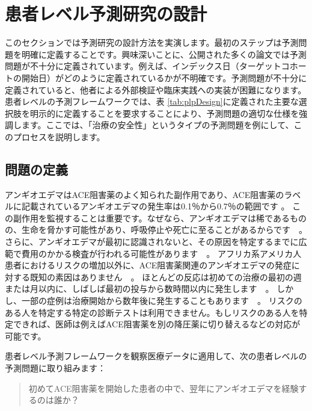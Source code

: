 \documentclass[
  11pt]{book}
\theoremstyle{definition}
\theoremstyle{definition}
\theoremstyle{definition}
\theoremstyle{definition}
\theoremstyle{remark}
\begin{document}
\section{患者レベル予測研究の設計}\label{ux60a3ux8005ux30ecux30d9ux30ebux4e88ux6e2cux7814ux7a76ux306eux8a2dux8a08}

このセクションでは予測研究の設計方法を実演します。最初のステップは予測問題を明確に定義することです。興味深いことに、公開された多くの論文では予測問題が不十分に定義されています。例えば、インデックス日（ターゲットコホートの開始日）がどのように定義されているかが不明確です。予測問題が不十分に定義されていると、他者による外部検証や臨床実践への実装が困難になります。患者レベルの予測フレームワークでは、表 \ref{tab:plpDesign}に定義された主要な選択肢を明示的に定義することを要求することにより、予測問題の適切な仕様を強調します。ここでは、「治療の安全性」というタイプの予測問題を例にして、このプロセスを説明します。 

\subsection{問題の定義}\label{ux554fux984cux306eux5b9aux7fa9-2}

アンギオエデマはACE阻害薬のよく知られた副作用であり、ACE阻害薬のラベルに記載されているアンギオエデマの発生率は0.1％から0.7％の範囲です \citep[ ]{byrd_2006}。 この副作用を監視することは重要です。なぜなら、アンギオエデマは稀であるものの、生命を脅かす可能性があり、呼吸停止や死亡に至ることがあるからです　\citep[ ]{norman_2013}。 さらに、アンギオエデマが最初に認識されないと、その原因を特定するまでに広範で費用のかかる検査が行われる可能性があります　\citep[ ]{norman_2013, thompson_1993}。 アフリカ系アメリカ人患者におけるリスクの増加以外に、ACE阻害薬関連のアンギオエデマの発症に対する既知の素因はありません　\citep[ ]{byrd_2006}。 ほとんどの反応は初めての治療の最初の週または月以内に、しばしば最初の投与から数時間以内に発生します　\citep[ ]{circardi_2004}。 しかし、一部の症例は治療開始から数年後に発生することもあります　\citep[ ]{mara_1996}。 リスクのある人を特定する特定の診断テストは利用できません。もしリスクのある人を特定できれば、医師は例えばACE阻害薬を別の降圧薬に切り替えるなどの対応が可能です。  

患者レベル予測フレームワークを観察医療データに適用して、次の患者レベルの予測問題に取り組みます：

\begin{quote}
初めてACE阻害薬を開始した患者の中で、翌年にアンギオエデマを経験するのは誰か？
\end{quote}
\end{document}
